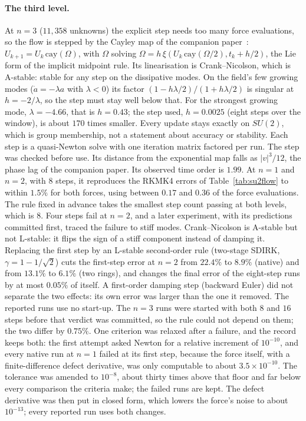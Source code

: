 \documentclass[11pt]{article}
\theoremstyle{definition}
\theoremstyle{remark}
\begin{document}
\paragraph{The third level.} At $n=3$ ($11{,}358$ unknowns) the explicit step needs too
many force evaluations, so the flow is stepped by the Cayley map of the companion
paper~\cite{threeways}: $U_{k+1}=U_k\,\mathrm{cay}(\Omega)$, with $\Omega$ solving
$\Omega=h\,\xi(U_k\,\mathrm{cay}(\Omega/2),t_k+h/2)$, the Lie form of the implicit midpoint
rule. Its linearisation is Crank--Nicolson, which is A-stable: stable for any step on the
dissipative modes. On the field's few growing modes ($\dot a=-\lambda a$ with $\lambda<0$) its factor
$(1-h\lambda/2)/(1+h\lambda/2)$ is singular at $h=-2/\lambda$, so the step must stay well below that.
For the strongest growing mode, $\lambda=-4.66$, that is $h=0.43$; the step used, $h=0.0025$ (eight steps
over the window), is about $170$ times smaller. Every update stays exactly on $SU(2)$,
which is group membership, not a statement about accuracy or stability. Each step is a quasi-Newton solve with one iteration matrix factored per
run. The step was checked before use. Its distance from the exponential map falls as
$|v|^3/12$, the phase lag of the companion paper. Its observed time order is $1.99$. At $n=1$
and $n=2$, with $8$ steps, it reproduces the RKMK4 errors of Table~\ref{tab:su2flow} to within
$1.5\%$ for both forces, using between $0.17$ and $0.36$ of the force evaluations. The
rule fixed in advance takes the smallest step count passing at both levels, which is $8$.
Four steps fail at $n=2$, and a later experiment, with its predictions committed first, traced
the failure to stiff modes. Crank--Nicolson is A-stable but not L-stable: it flips the sign of
a stiff component instead of damping it. Replacing the first step by an L-stable second-order
rule (two-stage SDIRK, $\gamma=1-1/\sqrt2$) cuts the first-step error at $n=2$ from $22.4\%$ to
$8.9\%$ (native) and from $13.1\%$ to $6.1\%$ (two rings), and changes the final error of the
eight-step runs by at most $0.05\%$ of itself. A first-order damping step (backward Euler) did not separate the two effects:
its own error was larger than the one it removed. The reported runs use no start-up.
The $n=3$ runs were started with both $8$ and $16$ steps before that verdict was committed,
so the rule could not depend on them; the two differ by $0.75\%$. One criterion was relaxed
after a failure, and the record keeps both: the first attempt asked Newton for a relative
increment of $10^{-10}$, and every native run at $n=1$ failed at its first step, because the
force itself, with a finite-difference defect derivative, was only computable to about
$3.5\times10^{-10}$. The tolerance was amended to $10^{-8}$, about thirty times above that
floor and far below every comparison the criteria make; the failed runs are kept. The
defect derivative was then put in closed form, which lowers the force's noise to about
$10^{-13}$; every reported run uses both changes.
\end{document}
